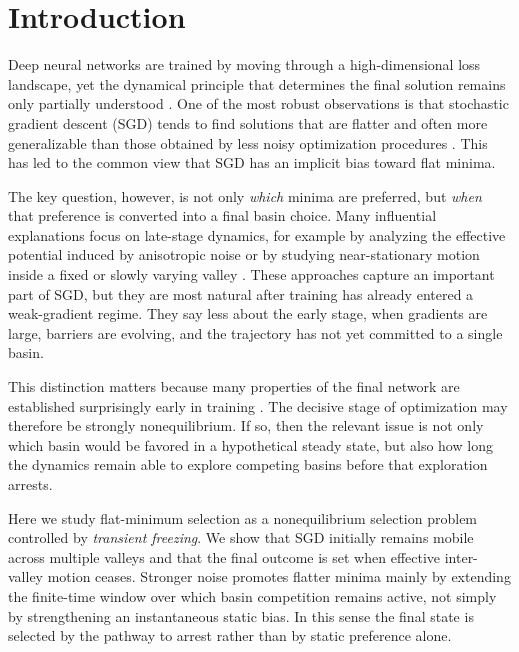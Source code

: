 \documentclass[aps,prx,reprint,superscriptaddress,longbibliography,nofootinbib,floatfix]{revtex4-2}
\begin{document}
\section{Introduction}
Deep neural networks are trained by moving through a high-dimensional loss landscape, yet the dynamical principle that determines the final solution remains only partially understood \cite{lecunDeepLearning2015,levineMachineLearningMeets2024a,liuLossLandscapesOptimization2022,sunGlobalLandscapeNeural2020}. One of the most robust observations is that stochastic gradient descent (SGD) tends to find solutions that are flatter and often more generalizable than those obtained by less noisy optimization procedures \cite{hochreiterFlatMinima1997,liVisualizingLossLandscape2018,jastrzebskiThreeFactorsInfluencing2018,wuHowSGDSelects2018,keskarLargeBatchTrainingDeep2017,chenSimpleConnectionLoss2024}. This has led to the common view that SGD has an implicit bias toward flat minima.

The key question, however, is not only \emph{which} minima are preferred, but \emph{when} that preference is converted into a final basin choice. Many influential explanations focus on late-stage dynamics, for example by analyzing the effective potential induced by anisotropic noise or by studying near-stationary motion inside a fixed or slowly varying valley \cite{zhuAnisotropicNoiseStochastic2019,xieDiffusionTheoryDeep2021,weiHowNoiseAffects2019,yangStochasticGradientDescent2023}. These approaches capture an important part of SGD, but they are most natural after training has already entered a weak-gradient regime. They say less about the early stage, when gradients are large, barriers are evolving, and the trajectory has not yet committed to a single basin.

This distinction matters because many properties of the final network are established surprisingly early in training \cite{gur-ariGradientDescentHappens2018,achilleCriticalLearningPeriods2019,fengPhasesLearningDynamics2021a,kalraPhaseDiagramEarly2023,jastrzebskiBreakEvenPointOptimization2020}. The decisive stage of optimization may therefore be strongly nonequilibrium. If so, then the relevant issue is not only which basin would be favored in a hypothetical steady state, but also how long the dynamics remain able to explore competing basins before that exploration arrests.

Here we study flat-minimum selection as a nonequilibrium selection problem controlled by \emph{transient freezing}. We show that SGD initially remains mobile across multiple valleys and that the final outcome is set when effective inter-valley motion ceases. Stronger noise promotes flatter minima mainly by extending the finite-time window over which basin competition remains active, not simply by strengthening an instantaneous static bias. In this sense the final state is selected by the pathway to arrest rather than by static preference alone.
\end{document}
